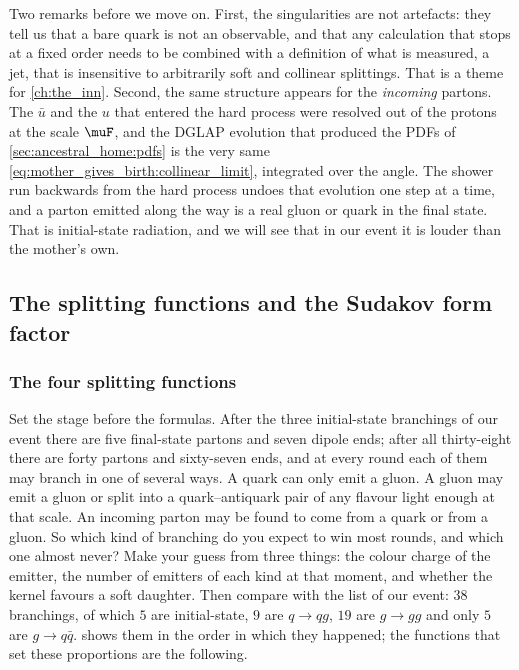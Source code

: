 Two remarks before we move on. First, the singularities are not artefacts:
they tell us that a bare quark is not an observable, and that any
calculation that stops at a fixed order needs to be combined with a
definition of what is measured, a jet, that is insensitive to arbitrarily
soft and collinear splittings. That is a theme for \cref{ch:the_inn}.
Second, the same structure appears for the \emph{incoming} partons. The
$\bar u$ and the $u$ that entered the hard process were resolved out of the
protons at the scale $\muF$, and the DGLAP evolution that produced the PDFs
of \cref{sec:ancestral_home:pdfs} is the very same
\cref{eq:mother_gives_birth:collinear_limit}, integrated over the angle. The
shower run backwards from the hard process undoes that evolution one step
at a time, and a parton emitted along the way is a real gluon or quark in
the final state. That is initial-state radiation, and we will see that in
our event it is louder than the mother's own.

\subsection{The splitting functions and the Sudakov form factor}
\label{sec:mother_gives_birth:splitting_sudakov}

\subsubsection{The four splitting functions}
\label{sec:mother_gives_birth:splitting_functions}

Set the stage before the formulas. After the three initial-state branchings
of our event there are five final-state partons and seven dipole ends;
after all thirty-eight there are forty partons and sixty-seven ends, and at every
round each of them may branch in one of several ways. A quark can only emit
a gluon. A gluon may emit a gluon or split into a quark--antiquark pair of
any flavour light enough at that scale. An incoming parton may be found to
come from a quark or from a gluon. So which kind of branching do you expect
to win most rounds, and which one almost never? Make your guess from three
things: the colour charge of the emitter, the number of emitters of each
kind at that moment, and whether the kernel favours a soft daughter. Then
compare with the list of our event: $38$ branchings, of which $5$ are
initial-state, $9$ are $q\to qg$, $19$ are $g\to gg$ and only $5$ are
$g\to q\bar q$.  shows
them in the order in which they happened; the functions that set these
proportions are the following.

